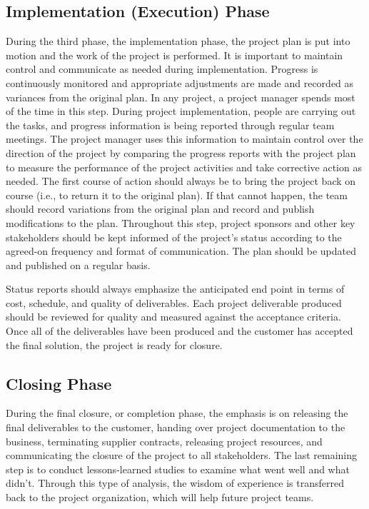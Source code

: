 \documentclass[18 pt]{article}
\begin{document}
\begin{large}
\subsection{Implementation (Execution) Phase}
During the third phase, the implementation phase, the project plan is put into motion and the work of the project is performed. It is important to maintain control and communicate as needed during implementation. Progress is continuously monitored and appropriate adjustments are made and recorded as variances from the original plan. In any project, a project manager spends most of the time in this step. During project implementation, people are carrying out the tasks, and progress information is being reported through regular team meetings. The project manager uses this information to maintain control over the direction of the project by comparing the progress reports with the project plan to measure the performance of the project activities and take corrective action as needed. The first course of action should always be to bring the project back on course (i.e., to return it to the original plan). If that cannot happen, the team should record variations from the original plan and record and publish modifications to the plan. Throughout this step, project sponsors and other key stakeholders should be kept informed of the project’s status according to the agreed-on frequency and format of communication. The plan should be updated and published on a regular basis.


Status reports should always emphasize the anticipated end point in terms of cost, schedule, and quality of deliverables. Each project deliverable produced should be reviewed for quality and measured against the acceptance criteria. Once all of the deliverables have been produced and the customer has accepted the final solution, the project is ready for closure.
\subsection{Closing Phase}
During the final closure, or completion phase, the emphasis is on releasing the final deliverables to the customer, handing over project documentation to the business, terminating supplier contracts, releasing project resources, and communicating the closure of the project to all stakeholders. The last remaining step is to conduct lessons-learned studies to examine what went well and what didn’t. Through this type of analysis, the wisdom of experience is transferred back to the project organization, which will help future project teams.



\end{large}
\end{document}
